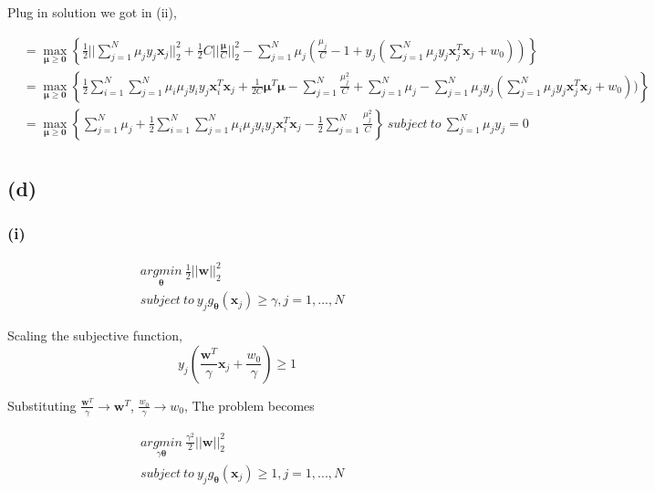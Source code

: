 \documentclass[11pt]{article}
\begin{document}
Plug in solution we got in (ii),

\begin{equation}
\begin{split}
&=\max_{\pmb{\mu}\ge\pmb{0}}\left\{\frac{1}{2}||\sum_{j=1}^{N}\mu_jy_j\pmb{x}_j||^2_2 + \frac{1}{2}C||\frac{\pmb{\mu}}{C}||^2_2 - \sum_{j=1}^{N}\mu_j(\frac{\mu_j}{C}-1+y_j(\sum_{j=1}^{N}\mu_jy_j\pmb{x}_j^T\pmb{x}_j+w_0))\right\}\\
&=\max_{\pmb{\mu}\ge\pmb{0}}\left\{\frac{1}{2}\sum_{i=1}^{N}\sum_{j=1}^{N}\mu_i\mu_jy_iy_j\pmb{x}_i^T\pmb{x}_j + \frac{1}{2C}\pmb{\mu}^T\pmb{\mu} - \sum_{j=1}^{N}\frac{\mu^2_j}{C}+\sum_{j=1}^{N}\mu_j-\sum_{j=1}^{N}\mu_jy_j(\sum_{j=1}^{N}\mu_jy_j\pmb{x}_j^T\pmb{x}_j+w_0))\right\}\\
&=\max_{\pmb{\mu}\ge\pmb{0}}\left\{\sum_{j=1}^{N}\mu_j+\frac{1}{2}\sum_{i=1}^{N}\sum_{j=1}^{N}\mu_i\mu_jy_iy_j\pmb{x}_i^T\pmb{x}_j-\frac{1}{2}\sum_{j=1}^{N}\frac{\mu^2_j}{C}\right\}\ subject\ to\ \sum_{j=1}^{N}\mu_jy_j = 0\\
\end{split}
\end{equation}
\pagebreak
\subsection*{(d)}
\subsubsection*{(i)}
\begin{equation}
\begin{split}
&\underset{\pmb{\theta}}{argmin}\ \frac{1}{2}||\pmb{w}||^2_2 \\
&subject\ to\ y_jg_{\pmb{\theta}}(\pmb{x}_j)\ge \gamma,j=1,...,N
\end{split}
\end{equation}

Scaling the subjective function,
$$y_j(\frac{\pmb{w}^T}{\gamma}\pmb{x}_j+\frac{w_0}{\gamma}) \ge 1$$

Substituting $\frac{\pmb{w}^T}{\gamma}\rightarrow \pmb{w}^T$, $\frac{w_0}{\gamma}\rightarrow w_0$, The problem becomes

\begin{equation}
\begin{split}
&\underset{\gamma\pmb{\theta}}{argmin}\ \frac{\gamma^2}{2}||\pmb{w}||^2_2 \\
&subject\ to\ y_jg_{\pmb{\theta}}(\pmb{x}_j)\ge 1,j=1,...,N
\end{split}
\end{equation}
\end{document}
